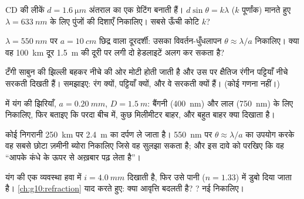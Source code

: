\begin{exercise}[$\star\star$]\label{exo:g12:light-as-wave:10}
CD की लीकें $d = \qty{1.6}{\micro m}$ अंतराल का एक ग्रेटिंग बनाती हैं। $d \sin\theta = k\lambda$ ($k$
पूर्णांक) मानते हुए $\lambda = \qty{633}{nm}$ के लिए पुंजों की दिशाएँ निकालिए। सबसे ऊँची कोटि
$k$?
\end{exercise}

\begin{exercise}[$\star\star$]\label{exo:g12:light-as-wave:11}
$\lambda =
\qty{550}{nm}$ पर $a = \qty{10}{cm}$ छिद्र वाला दूरदर्शी: उसका विवर्तन-धुँधलापन
$\theta \approx
\lambda/a$ निकालिए। क्या वह \qty{100}{km} दूर \qty{1.5}{m} की दूरी पर लगी दो हेडलाइटें अलग
कर सकता है?
\end{exercise}

\begin{exercise}[$\star\star\star$]\label{exo:g12:light-as-wave:12}
 टँगी साबुन की झिल्ली बहकर नीचे की ओर मोटी होती जाती है और उस पर
क्षैतिज रंगीन पट्टियाँ नीचे सरकती दिखती हैं। समझाइए: रंग क्यों, पट्टियाँ
क्यों, और वे सरकती क्यों हैं। (कोई गणना नहीं।)
\end{exercise}

\begin{exercise}[$\star\star\star$]\label{exo:g12:light-as-wave:13}
 में यंग की झिरियाँ, $a = \qty{0.20}{mm}$, $D = \qty{1.5}{m}$: बैंगनी (\qty{400}{nm})
और लाल (\qty{750}{nm}) के लिए  निकालिए, फिर बताइए कि परदा
बीच में, कुछ मिलीमीटर बाहर, और बहुत बाहर क्या दिखाता है।
\end{exercise}

\begin{exercise}[$\star\star\star$]\label{exo:g12:light-as-wave:14}
कोई निगरानी  \qty{250}{km} पर \qty{2.4}{m} का दर्पण ले जाता है। \qty{550}{nm}
पर $\theta \approx \lambda/a$ का उपयोग करके वह सबसे छोटा ज़मीनी ब्योरा निकालिए जिसे वह सुलझा
सकता है; और इस दावे को परखिए कि वह ``आपके कंधे के ऊपर से अख़बार पढ़ लेता
है''।
\end{exercise}

\begin{exercise}[$\star\star\star$]\label{exo:g12:light-as-wave:15}
यंग की एक व्यवस्था हवा में $i = \qty{4.0}{mm}$ दिखाती है, फिर उसे पानी ($n = 1.33$) में डुबो
दिया जाता है। \cref{ch:g10:refraction} याद करते हुए: क्या आवृत्ति बदलती है?
? नई  निकालिए।
\end{exercise}

